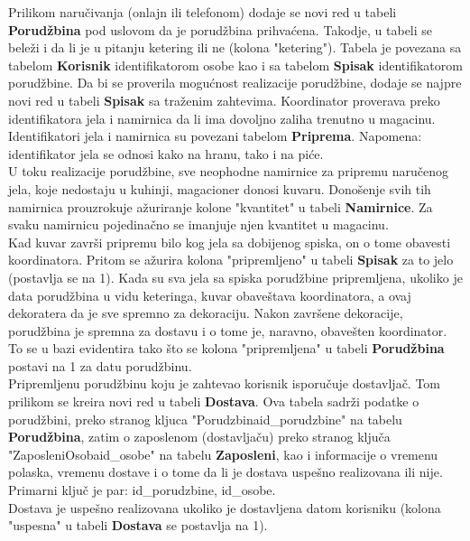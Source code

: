 Prilikom naručivanja (onlajn ili telefonom) dodaje se novi red u tabeli \textbf{Porudžbina} pod uslovom da je porudžbina prihvaćena. Takodje, u tabeli se bele\v zi i da li je u pitanju ketering ili ne (kolona "ketering"). Tabela je povezana sa tabelom \textbf{Korisnik} identifikatorom osobe kao i sa tabelom \textbf{Spisak} identifikatorom porudžbine. Da bi se proverila mogućnost realizacije porudžbine, dodaje se najpre novi red u tabeli \textbf{Spisak} sa traženim zahtevima. Koordinator proverava preko identifikatora jela i namirnica da li ima dovoljno zaliha trenutno u magacinu. Identifikatori jela i namirnica su povezani tabelom \textbf{Priprema}. Napomena: identifikator jela se odnosi kako na hranu, tako i na piće.
\\

U toku realizacije porud\v zbine, sve neophodne namirnice za pripremu naru\v cenog jela, koje nedostaju u kuhinji, magacioner donosi kuvaru. Dono\v senje svih tih namirnica prouzrokuje a\v zuriranje kolone "kvantitet" u tabeli \textbf{Namirnice}. Za svaku namirnicu pojedina\v cno se imanjuje njen kvantitet u magacinu.\\

\indent Kad kuvar zavr\v si pripremu bilo kog jela sa dobijenog spiska, on o tome obavesti koordinatora. Pritom se a\v zurira kolona "pripremljeno" u tabeli \textbf{Spisak} za to jelo (postavlja se na 1). Kada su sva jela sa spiska porud\v zbine pripremljena, ukoliko je data porud\v zbina u vidu keteringa, kuvar obave\v stava koordinatora, a ovaj dekoratera da je sve spremno za dekoraciju. Nakon zavr\v sene dekoracije, porud\v zbina je spremna za dostavu i o tome je, naravno, obave\v sten koordinator. To se u bazi evidentira tako \v sto se kolona "pripre\-mljena" u tabeli \textbf{Porud\v zbina} postavi na 1 za datu porud\v zbinu.\\

\indent Pripremljenu porud\v zbinu koju je zahtevao korisnik isporu\v cuje dostavlja\v c. Tom prilikom se kreira novi red u tabeli \textbf{Dostava}. Ova tabela sadr\v zi podatke o porud\v zbini, preko stranog kljuca "Porudzbinaid\_porudzbine" na tabelu \textbf{Porud\v zbina}, zatim o zaposlenom (dostavlja\v cu) preko stranog klju\v ca "ZaposleniOsobaid\_osobe" na tabelu  \textbf{Zaposleni}, kao i informacije o vremenu polaska, vremenu dostave i o tome da li je dostava uspe\v sno realizovana ili nije. Primarni klju\v c je par: id\_porudzbine, id\_osobe.\\
\indent Dostava je uspe\v sno realizovana ukoliko je dostavljena datom korisniku (kolona "uspesna" u tabeli \textbf{Dostava} se postavlja na 1).\\

